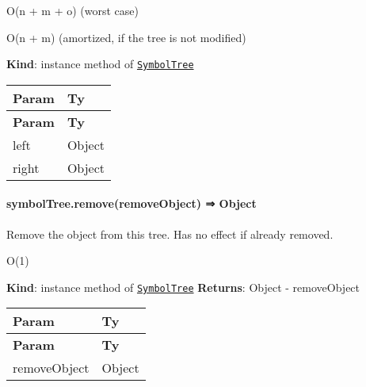 \begin{DoxyItemize}
\item {\ttfamily O(n + m + o)} (worst case)
\item {\ttfamily O(n + m)} (amortized, if the tree is not modified)
\end{DoxyItemize}

{\bfseries Kind}\+: instance method of {\ttfamily \href{#exp_module_symbol-tree--SymbolTree}{\tt Symbol\+Tree}}

\tabulinesep=1mm
\begin{longtabu} spread 0pt [c]{*{2}{|X[-1]}|}
\hline
\rowcolor{\tableheadbgcolor}\textbf{ Param  }&\textbf{ Ty   }\\
\endfirsthead
\hline
\endfoot
\hline
\rowcolor{\tableheadbgcolor}\textbf{ Param  }&\textbf{ Ty   }\\
\endhead
left  &{\ttfamily Object}   \\
right  &{\ttfamily Object}   \\
\end{longtabu}


\label{_module_symbol-tree--SymbolTree+remove}%


\paragraph*{symbol\+Tree.\+remove(remove\+Object) ⇒ {\ttfamily Object}}

Remove the object from this tree. Has no effect if already removed.


\begin{DoxyItemize}
\item {\ttfamily O(1)}
\end{DoxyItemize}

{\bfseries Kind}\+: instance method of {\ttfamily \href{#exp_module_symbol-tree--SymbolTree}{\tt Symbol\+Tree}} {\bfseries Returns}\+: {\ttfamily Object} -\/ remove\+Object

\tabulinesep=1mm
\begin{longtabu} spread 0pt [c]{*{2}{|X[-1]}|}
\hline
\rowcolor{\tableheadbgcolor}\textbf{ Param  }&\textbf{ Ty   }\\
\endfirsthead
\hline
\endfoot
\hline
\rowcolor{\tableheadbgcolor}\textbf{ Param  }&\textbf{ Ty   }\\
\endhead
remove\+Object  &{\ttfamily Object}   \\
\end{longtabu}


